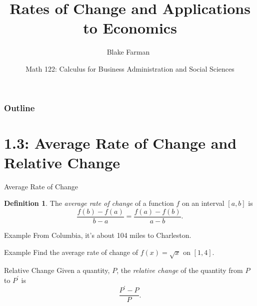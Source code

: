\documentclass{beamer}
\title %
    {Rates of Change and Applications to Economics}
\author[Farman]
{Blake Farman~\inst{1}}
\institute[USC]{
\inst{1}
University of South Carolina, Columbia, SC USA}
\date[January 12, 2017]
{Math 122: Calculus for Business Administration and Social Sciences}
\theoremstyle{definition}
\newtheorem{defn}{Definition}
\newtheorem{rmk}{Remark}
\begin{document}
\begin{frame}
  \titlepage
\end{frame}

\begin{frame}
  \frametitle{Outline}
  \tableofcontents[pausesections]
\end{frame}

\section{1.3: Average Rate of Change and Relative Change}

\begin{frame}{Average Rate of Change}
  \begin{defn}
    The {\it average rate of change} of a function $f$ on an interval $[a,b]$ is
    $$\frac{f(b) - f(a)}{b - a} = \frac{f(a) - f(b)}{a - b}.$$
  \end{defn}
\end{frame}

\begin{frame}{Example}
  From Columbia, it's about 104 miles to Charleston.
  \\

  
\end{frame}

\begin{frame}{Example}
  Find the average rate of change of $f(x) = \sqrt{x}$ on $[1,4]$.

\end{frame}

\begin{frame}{Relative Change}
  Given a quantity, $P$, the {\it relative change} of the quantity from $P$ to $P^\prime$ is
  $$\frac{P^\prime - P}{P}.$$
\end{frame}
\end{document}

